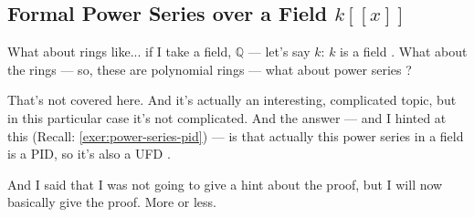 \subsection{Formal Power Series over a Field \texorpdfstring{$k[[x]]$}{k[[x]]}}

\begin{speech}[00:03:11 - 00:03:56]
What about rings like... if I take a field, $\mathbb{Q}$ --- let's say $k$: $k$ is a field . What about the rings --- so, these are polynomial rings  --- what about power series ?

That's not covered here. And it's actually an interesting, complicated topic, but in this particular case it's not complicated. And the answer --- and I hinted at this (Recall: \cref{exer:power-series-pid}) --- is that actually this power series in a field is a PID, so it's also a UFD .

And I said that I was not going to give a hint about the proof, but I will now basically give the proof. More or less.
\end{speech}

\begin{content}
\end{content}

